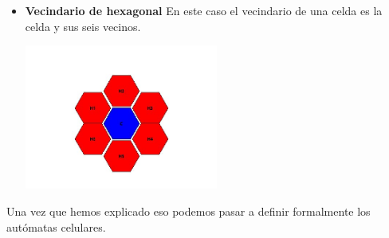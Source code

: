 \begin{itemize}
\begin{minipage}
                \label{fig:vonNeX}
            \end{minipage}
        \item
            \begin{minipage}
                {0.5\textwidth}
                \textbf{Vecindario de hexagonal} En este caso el vecindario de una celda es la celda y sus seis vecinos.
            \end{minipage}
            \begin{minipage}
                {0.5\textwidth}
                \centering
                \includegraphics[width=0.5\textwidth]{./images/marco_teorico/automatas_celulares/hexN.jpg}
                \label{fig:hexN}
            \end{minipage}
    \end{itemize}
    \vskip 0.5cm
    Una vez que hemos explicado eso podemos pasar a definir formalmente los aut\'omatas celulares.
    \vskip 0.5cm